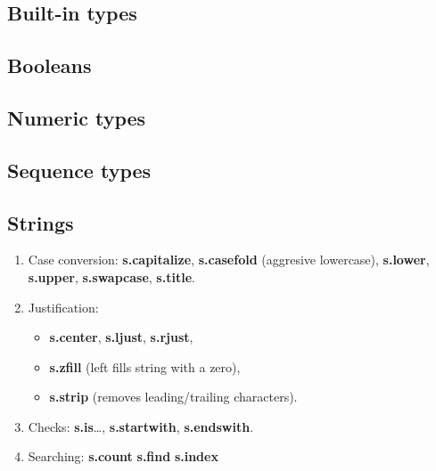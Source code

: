 \documentclass[a4paper, twoside, 8pt]{extarticle}
\newenvironment{enumx} {
	\begin{enumerate}[leftmargin=*]
	\setlength{\topsep}{0pt}
	\setlength{\itemsep}{0pt}
	\setlength{\parskip}{0pt}
	\setlength{\parsep}{0pt}
	}
{\end{enumerate}}
\newenvironment{itemx} {
	\begin{itemize}[leftmargin=*,noitemsep,topsep=0pt]
	}
{\end{itemize}}
\newcommand{\python}[1] {\textbf{\color{blue}#1}}
\begin{document}
\renewcommand{\footrulewidth}{0.4pt}


\begin{multicols*}{3}
\raggedright
\section{Built-in types}

\subsection{Booleans}

\subsection{Numeric types}


\subsection{Sequence types}

\subsection{Strings}
\begin{enumx}
\item Case conversion: 
\python{s.capitalize}, 
\python{s.casefold} (aggresive lowercase), 
\python{s.lower}, 
\python{s.upper}, 
\python{s.swapcase}, 
\python{s.title}.

\item Justification: 
\begin{itemx}
	\item \python{s.center},
		  \python{s.ljust},
	      \python{s.rjust},

	\item \python{s.zfill} 
	(left fills string with a zero),

	\item \python{s.strip} 
	(removes leading/trailing characters).
\end{itemx}

\item Checks:
\python{s.is}\ldots,
\python{s.startwith}, 
\python{s.endswith}.

\item Searching:
\python{s.count} 
\python{s.find} 
\python{s.index} 


\end{enumx}
\end{multicols*}
\end{document}
